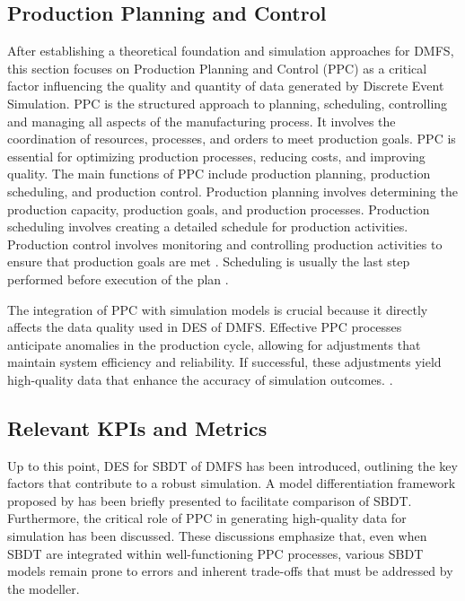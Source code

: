 \subsection{Production Planning and Control}
After establishing a theoretical foundation and simulation approaches for DMFS, this section focuses on Production Planning and Control (PPC) as a critical factor influencing the quality and quantity of data generated by Discrete Event Simulation.
PPC is the structured approach to planning, scheduling, controlling and managing all aspects of the manufacturing process. It involves the coordination of resources, processes, and orders to meet production goals. PPC is essential for optimizing production processes, reducing costs, and improving quality. The main functions of PPC include production planning, production scheduling, and production control. Production planning involves determining the production capacity, production goals, and production processes. Production scheduling involves creating a detailed schedule for production activities. Production control involves monitoring and controlling production activities to ensure that production goals are met \parencite{kiran2019production}. Scheduling is usually the last step performed before execution of the plan \parencite{pinedo2012design}.

The integration of PPC with simulation models is crucial because it directly affects the data quality used in DES of DMFS. Effective PPC processes anticipate anomalies in the production cycle, allowing for adjustments that maintain system efficiency and reliability. If successful, these adjustments yield high-quality data that enhance the accuracy of simulation outcomes. \parencite{kiran2019production}.


\subsection{Relevant KPIs and Metrics}
Up to this point, DES for SBDT of DMFS has been introduced, outlining the key factors that contribute to a robust simulation. A model differentiation framework proposed by \citeauthor*{schwede2024learning} has been briefly presented to facilitate comparison of SBDT. Furthermore, the critical role of PPC in generating high-quality data for simulation has been discussed. These discussions emphasize that, even when SBDT are integrated within well-functioning PPC processes, various SBDT models remain prone to errors and inherent trade-offs that must be addressed by the modeller.

